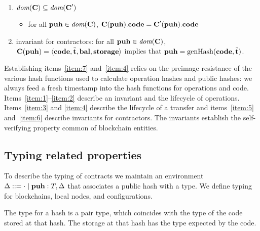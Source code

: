 \documentclass[a4paper]{llncs}
\begin{document}
\begin{proposition}
\begin{enumerate}
 \item\label{item:5} $ \DOM (\CONTRACTORS) \subseteq \DOM (\CONTRACTORS')$
   \begin{itemize}
   \item for all $\PUH \in \DOM (\CONTRACTORS)$,
     $\CONTRACTORS (\PUH).\CODE = \CONTRACTORS' (\PUH).\CODE$
   \end{itemize}
 \item\label{item:6} invariant for contractors:
   for all $\PUH \in \DOM (\CONTRACTORS)$,
   $\CONTRACTORS (\PUH) = \Angle{ \CODE, \tilde\TIME, \BAL, \STORAGE}$
   implies that $\PUH = \GENERATEHASH (\CODE, \tilde\TIME)$.
\end{enumerate}
\end{proposition}
Establishing items~\ref{item:7} and~\ref{item:4} relies on the preimage resistance of the
various hash functions used to calculate operation hashes and public
hashes: we always feed a fresh timestamp into the hash
functions for operations and code. Items~\ref{item:1}--\ref{item:2} describe an invariant and
the lifecycle of 
operations. Items~\ref{item:3} and \ref{item:4} describe the lifecycle
of a transfer and items~\ref{item:5} and~\ref{item:6} describe
invariants for contractors. The invariants establish the
self-verifying property common of blockchain entities.

\subsection{Typing related properties}
To describe the typing of contracts we maintain an environment
$\Delta ::= \EmptyEnv \mid \PUH: \TYPE, \Delta$ that associates a
public hash with a type.
We define typing for blockchains, local nodes, and configurations.
\begin{mathpar}
\end{mathpar}
The type for a hash is a pair type, which coincides with the type of
the code stored at that hash. The storage at that hash has the type
expected by the code.
\begin{mathpar}

\end{mathpar}
\end{document}
